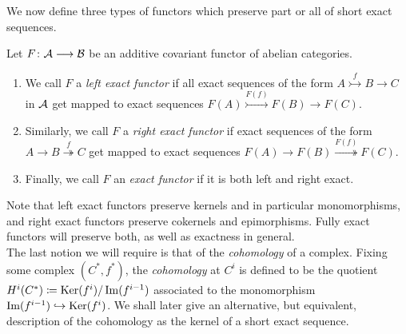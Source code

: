 \documentclass[a4paper]{article}
\def\into{\hookrightarrow}
\def\mono{\rightarrowtail}
\def\epi{\twoheadrightarrow}
\begin{document}
We now define three types of functors which preserve part or all of short exact sequences.
\begin{Definition}
    Let $F\colon\mathcal{A}\longrightarrow \mathcal{B}$ be an additive covariant functor of abelian categories.
    \begin{enumerate}
        \item We call $F$ a \emph{left exact functor} if all exact sequences of the form $A \stackrel{f}{\mono} B \to C$ in $\mathcal{A}$ get mapped to exact sequences $F(A) \stackrel{F(f)}{\mono} F(B) \to F(C)$.
        \item Similarly, we call $F$ a \emph{right exact functor} if exact sequences of the form $A \to B \stackrel{f}{\epi} C$ get mapped to exact sequences $F(A) \to F(B) \stackrel{F(f)}{\epi} F(C)$.
        \item Finally, we call $F$ an \emph{exact functor} if it is both left and right exact.
    \end{enumerate}
\end{Definition}
Note that left exact functors preserve kernels and in particular monomorphisms, and right exact functors preserve cokernels and epimorphisms. Fully exact functors will preserve both, as well as exactness in general.\\

The last notion we will require is that of the \emph{cohomology} of a complex. Fixing some complex $(C^*, f^*)$, the \emph{cohomology} at $C^i$ is defined to be the quotient $H^{i}(C^*) \coloneqq \operatorname{Ker}(f^i)/\operatorname{Im}(f^{i-1})$ associated to the monomorphism $\im(f^{i-1}) \into \Ker(f^{i})$. We shall later give an alternative, but equivalent, description of the cohomology as the kernel of a short exact sequence. 
\end{document}
